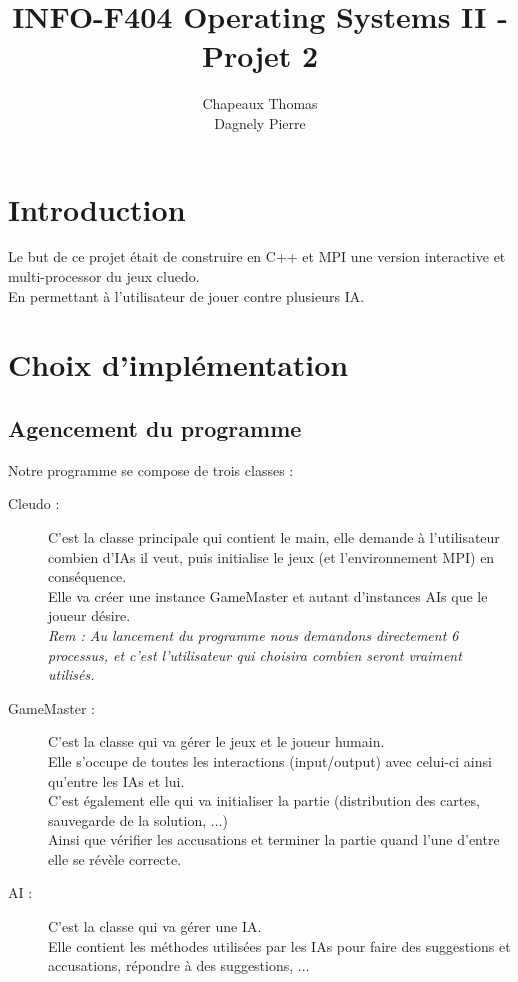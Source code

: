 \documentclass[a4paper,10pt]{article}
\title{INFO-F404 Operating Systems II - Projet 2}
\author{Chapeaux Thomas\\Dagnely Pierre}
\begin{document}
\maketitle

\section{Introduction}

	Le but de ce projet était de construire en C++ et MPI une version interactive et multi-processor du jeux cluedo.\\
	En permettant à l'utilisateur de jouer contre plusieurs IA.

\section{Choix d'implémentation}

	\subsection{Agencement du programme}
		Notre programme se compose de trois classes :
		\begin{description}
			\item[Cleudo :] C'est la classe principale qui contient le main, elle demande à l'utilisateur combien d'IAs il veut, puis initialise le jeux (et l’environnement MPI) en conséquence.\\
							Elle va créer une instance GameMaster et autant d'instances AIs que le joueur désire.\\
							\textit{Rem : Au lancement du programme nous demandons directement 6 processus, et c'est l'utilisateur qui choisira combien seront vraiment utilisés.}
			\item[GameMaster :] C'est la classe qui va gérer le jeux et le joueur humain.\\
							Elle s'occupe de toutes les interactions (input/output) avec celui-ci ainsi qu'entre les IAs et lui.\\
							C'est également elle qui va initialiser la partie (distribution des cartes, sauvegarde de la solution, ...)\\
							Ainsi que vérifier les accusations et terminer la partie quand l'une d'entre elle se révèle correcte.
			\item[AI :]	C'est la classe qui va gérer une IA.\\
							Elle contient les méthodes utilisées par les IAs pour faire des suggestions et accusations, répondre à des suggestions, ...
		\end{description}
		
\end{document}
